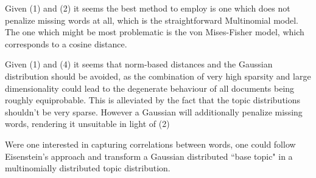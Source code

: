 Given (1) and (2) it seems the best method to employ is one which does not penalize missing words at all, which is the straightforward Multinomial model. The one which might be most problematic is the von Mises-Fisher model, which corresponds to a cosine distance.

Given (1) and (4)  it seems that norm-based distances and the Gaussian distribution should be avoided, as the combination of very high sparsity and large dimensionality could lead to the degenerate behaviour of all documents being roughly equiprobable. This is alleviated by the fact that the topic distributions shouldn't be very sparse. However a Gaussian will additionally penalize missing words, rendering it unsuitable in light of (2)

Were one interested in capturing correlations between words, one could follow Eisenstein's approach and transform a Gaussian distributed ``base topic" in a multinomially distributed topic distribution.


